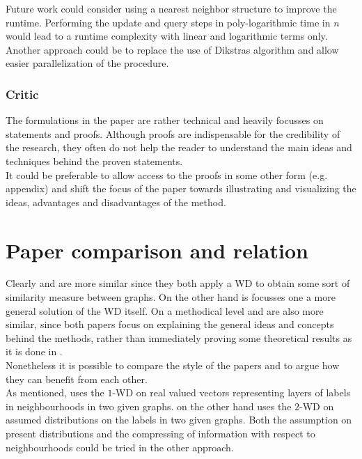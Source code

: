 \documentclass[twoside,twocolumn]{scrartcl}
\begin{document}
Future work could consider using a nearest neighbor structure to improve the runtime. Performing the update and query steps in poly-logarithmic time in $n$ would lead to a runtime complexity with linear and logarithmic terms only. \\
Another approach could be to replace the use of Dikstras algorithm and allow easier parallelization of the procedure.\\

\subsubsection{Critic}
The formulations in the paper are rather technical and heavily focusses on statements and proofs. Although proofs are indispensable for the credibility of the research, they often do not help the reader to understand the main ideas and techniques behind the proven statements.\\
It could be preferable to allow access to the proofs in some other form (e.g. appendix) and shift the focus of the paper towards illustrating and visualizing the ideas, advantages and disadvantages of the method.

\section{Paper comparison and relation}
Clearly \cite{A} and \cite{B} are more similar since they both apply a WD to obtain some sort of similarity measure between graphs. On the other hand \cite{C} is focusses one a more general solution of the WD itself. On a methodical level \cite{A} and \cite{B} are also more similar, since both papers focus on explaining the general ideas and concepts behind the methods, rather than immediately proving some theoretical results as it is done in \cite{C}.\\

Nonetheless it is possible to compare the style of the papers and to argue how they can benefit from each other.\\

As mentioned, \cite{A} uses the $1$-WD on real valued vectors representing layers of labels in neighbourhoods in two given graphs. \cite{B} on the other hand uses the $2$-WD on assumed distributions on the labels in two given graphs. Both the assumption on present distributions and the compressing of information with respect to neighbourhoods could be tried in the other approach.\\
\end{document}
